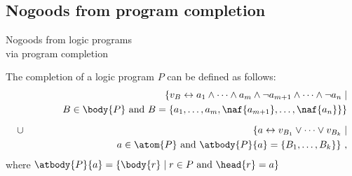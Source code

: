 \subsection{Nogoods from program completion}
\begin{frame}[c]{Nogoods from logic programs\\[-1ex]\normalsize via program completion}

The completion of a logic program $P$ can be defined as follows:
%
\begin{eqnarray*}
  &&
  \{
  v_B \leftrightarrow
  a_1          \wedge \dots \wedge a_m      \wedge
  \neg a_{m+1} \wedge \dots \wedge \neg a_n \mid
  \\&&\qquad\quad
  B \in\body{P} \text{ and }
  B = \{a_1,\dots,a_m,\naf{a_{m+1}},\dots,\naf{a_n}\}
  \}
  \\[6pt]
  &\cup&
  \{
  a \leftrightarrow
  v_{B_1} \vee \dots \vee v_{B_k}
  \mid
  \\&&\qquad\quad
  a\in\atom{P} \text{ and }
  \atbody{P}{a} = \{B_1,\dots,B_k\}
  \}\ ,
\end{eqnarray*}
%
where $\atbody{P}{a}=\{\body{r}\mid r\in P\text{ and }\head{r}=a\}$
\end{frame}
